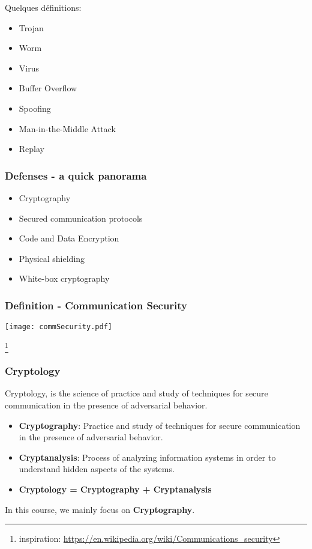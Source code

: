 \documentclass[
hyperref={pdfpagelabels=false}
,xcolor=table
]
{beamer}
\begin{document}
Quelques définitions:
\begin{itemize}
\item Trojan
\item Worm
\item Virus
\item Buffer Overflow
\item Spoofing
\item Man-in-the-Middle Attack
\item Replay
\end{itemize}


\begin{frame}
  \frametitle{Defenses - a quick panorama}
  \begin{itemize}
  \item Cryptography
  \item Secured communication protocols
  \item Code and Data Encryption
  \item Physical shielding
  \item White-box cryptography    
  \end{itemize}
\end{frame}


\begin{frame}[fragile]
  \frametitle{Definition - Communication Security}

  \begin{block}{}
    \begin{center}
      \texttt{[image: commSecurity.pdf]}
    \end{center}
    \footnote{inspiration: \url{https://en.wikipedia.org/wiki/Communications_security}}
  \end{block}
\end{frame}


\begin{frame}
  \frametitle{Cryptology}

  Cryptology, is the science of practice and study of techniques for secure communication in the presence of adversarial behavior.

  \begin{itemize}
  \item \textbf{Cryptography}: Practice and study of techniques for secure communication in the presence of adversarial behavior.
  \item \textbf{Cryptanalysis}: Process of analyzing information systems in order to understand hidden aspects of the systems. 
  \item \textbf{Cryptology = Cryptography + Cryptanalysis}
  \end{itemize}

  In this course, we mainly focus on \textbf{Cryptography}. 
\end{frame}
\end{document}
